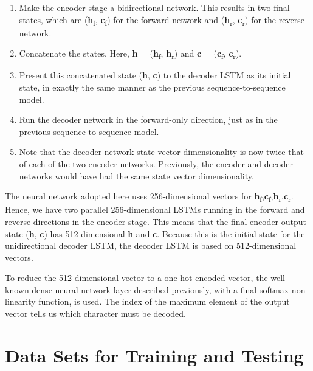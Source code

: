 \documentclass[
]{article}
\begin{document}
\begin{enumerate}
\def\labelenumi{\arabic{enumi}.}
\item
  Make the encoder stage a bidirectional network. This results in two
  final states, which are (\textbf{h}\textsubscript{f},
  \textbf{c}\textsubscript{f}) for the forward network and
  (\textbf{h}\textsubscript{r}, \textbf{c}\textsubscript{r}) for the
  reverse network.
\item
  Concatenate the states. Here, \textbf{h} =
  (\textbf{h}\textsubscript{f}, \textbf{h}\textsubscript{r}) and
  \textbf{c} = (\textbf{c}\textsubscript{f},
  \textbf{c}\textsubscript{r}).
\item
  Present this concatenated state (\textbf{h}, \textbf{c}) to the
  decoder LSTM as its initial state, in exactly the same manner as the
  previous sequence-to-sequence model.
\item
  Run the decoder network in the forward-only direction, just as in the
  previous sequence-to-sequence model.
\item
  Note that the decoder network state vector dimensionality is now twice
  that of each of the two encoder networks. Previously, the encoder and
  decoder networks would have had the same state vector dimensionality.
\end{enumerate}

The neural network adopted here uses 256-dimensional vectors for
\textbf{h}\textsubscript{f},\textbf{c}\textsubscript{f},\textbf{h}\textsubscript{r},\textbf{c}\textsubscript{r}.
Hence, we have two parallel 256-dimensional LSTMs running in the forward
and reverse directions in the encoder stage. This means that the final
encoder output state (\textbf{h}, \textbf{c}) has 512-dimensional
\textbf{h} and \textbf{c}. Because this is the initial state for the
unidirectional decoder LSTM, the decoder LSTM is based on
512-dimensional vectors.

To reduce the 512-dimensional vector to a one-hot encoded vector, the
well-known dense neural network layer described previously, with a final
softmax non-linearity function, is used. The index of the maximum
element of the output vector tells us which character must be decoded.

\hypertarget{data-sets-for-training-and-testing}{%
\section{Data Sets for Training and
Testing}\label{data-sets-for-training-and-testing}}
\end{document}
